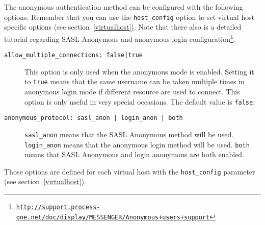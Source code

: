 \documentclass[a4paper,10pt]{book}
\newcommand{\bracehack}{\def\{{\char"7B}\def\}{\char"7D}}
\newcommand{\titem}[1]{\item[\bracehack\texttt{#1}]}
\newcommand{\term}[1]{\texttt{#1}}
\gdef\footahref#1#2{#2\footnote{\href{#1}{\texttt{#1}}}}
\begin{document}
The anonymous authentication method can be configured with the following
options. Remember that you can use the \term{host\_config} option to set virtual
host specific options (see section~\ref{virtualhost}). Note that there also
is a detailed tutorial regarding \footahref{http://support.process-one.net/doc/display/MESSENGER/Anonymous+users+support}{SASL
Anonymous and anonymous login configuration}.

\begin{description}
\titem{allow\_multiple\_connections: false|true} This option is only used
  when the anonymous mode is
  enabled. Setting it to \term{true} means that the same username can be taken
  multiple times in anonymous login mode if different resource are used to
  connect. This option is only useful in very special occasions. The default
  value is \term{false}.
\titem{anonymous\_protocol: sasl\_anon | login\_anon | both} 
  \term{sasl\_anon} means
  that the SASL Anonymous method will be used. \term{login\_anon} means that the
  anonymous login method will be used. \term{both} means that SASL Anonymous and
  login anonymous are both enabled.
\end{description}

Those options are defined for each virtual host with the \term{host\_config}
parameter (see section~\ref{virtualhost}).
\end{document}
